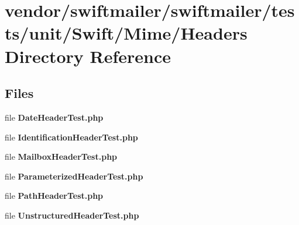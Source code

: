 \section{vendor/swiftmailer/swiftmailer/tests/unit/\+Swift/\+Mime/\+Headers Directory Reference}
\label{dir_25b53b84a8665930d21dbc48525da7c9}
\subsection*{Files}
\begin{DoxyCompactItemize}
\item 
file {\bf Date\+Header\+Test.\+php}
\item 
file {\bf Identification\+Header\+Test.\+php}
\item 
file {\bf Mailbox\+Header\+Test.\+php}
\item 
file {\bf Parameterized\+Header\+Test.\+php}
\item 
file {\bf Path\+Header\+Test.\+php}
\item 
file {\bf Unstructured\+Header\+Test.\+php}
\end{DoxyCompactItemize}
